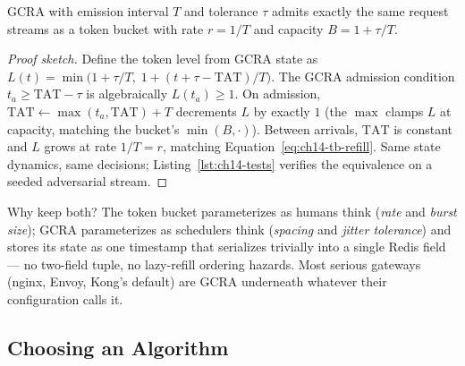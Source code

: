 \begin{proposition}
\label{prop:ch14-gcra-equiv}
GCRA with emission interval $T$ and tolerance $\tau$ admits exactly the
same request streams as a token bucket with rate $r = 1/T$ and capacity
$B = 1 + \tau/T$.
\end{proposition}

\begin{proof}[Proof sketch]
Define the token level from GCRA state as
$L(t) = \min\bigl(1 + \tau/T,\; 1 + (t + \tau - \mathrm{TAT})/T\bigr)$.
The GCRA admission condition $t_a \ge \mathrm{TAT} - \tau$ is algebraically
$L(t_a) \ge 1$. On admission, $\mathrm{TAT} \leftarrow \max(t_a,
\mathrm{TAT}) + T$ decrements $L$ by exactly $1$ (the $\max$ clamps $L$ at
capacity, matching the bucket's $\min(B, \cdot)$). Between arrivals,
$\mathrm{TAT}$ is constant and $L$ grows at rate $1/T = r$, matching
Equation~\eqref{eq:ch14-tb-refill}. Same state dynamics, same decisions;
Listing~\ref{lst:ch14-tests} verifies the equivalence on a seeded
adversarial stream.
\end{proof}

Why keep both? The token bucket parameterizes as humans think
(\emph{rate} and \emph{burst size}); GCRA parameterizes as schedulers think
(\emph{spacing} and \emph{jitter tolerance}) and stores its state as one
timestamp that serializes trivially into a single Redis field --- no
two-field tuple, no lazy-refill ordering hazards. Most serious gateways
(nginx, Envoy, Kong's default) are GCRA underneath whatever their
configuration calls it.

\subsection{Choosing an Algorithm}
\label{subsec:ch14-choosing}

